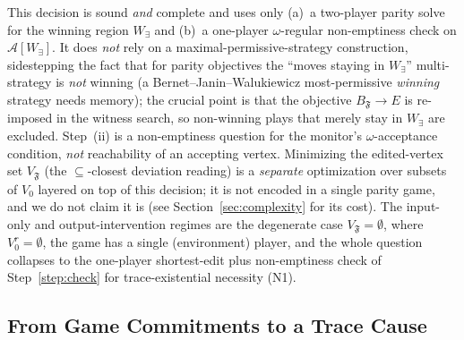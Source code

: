 \documentclass[11pt]{article}
\theoremstyle{remark}
\newcommand{\Frame}{\mathfrak{F}}
\begin{document}
This decision is sound \emph{and} complete and uses only (a)~a two-player parity
solve for the winning region \(W_\exists\) and (b)~a one-player
\(\omega\)-regular non-emptiness check on \(\mathcal{A}[W_\exists]\). It does
\emph{not} rely on a maximal-permissive-strategy construction, sidestepping the
fact that for parity objectives the ``moves staying in \(W_\exists\)''
multi-strategy is \emph{not} winning (a Bernet--Janin--Walukiewicz most-permissive
\emph{winning} strategy needs memory); the crucial point is that the objective
\(B_{\Frame}\rightarrow E\) is re-imposed in the witness search, so non-winning
plays that merely stay in \(W_\exists\) are excluded. Step~(ii) is a non-emptiness
question for the monitor's \(\omega\)-acceptance condition, \emph{not} reachability
of an accepting vertex. Minimizing the edited-vertex set \(V_{\Frame}\) (the
\(\subseteq\)-closest deviation reading) is a \emph{separate} optimization over
subsets of \(V_0\) layered on top of this decision; it is not encoded in a single
parity game, and we do not claim it is (see Section~\ref{sec:complexity} for its
cost). The input-only and output-intervention regimes are the degenerate case
\(V_{\Frame}=\emptyset\), where \(V^{r}_{0}=\emptyset\), the game has a single
(environment) player, and the whole question collapses to the one-player
shortest-edit plus non-emptiness check of Step~\ref{step:check} for
trace-existential necessity (N1).

\subsection{From Game Commitments to a Trace Cause}
\label{sec:dominion-translation}
\end{document}
